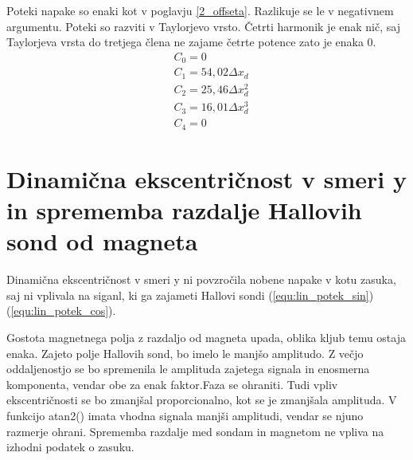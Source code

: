 Poteki napake so enaki kot v poglavju \ref{2_offseta}. Razlikuje se le v negativnem argumentu. Poteki so razviti v Taylorjevo vrsto. Četrti harmonik je enak nič, saj Taylorjeva vrsta do tretjega člena ne zajame četrte potence zato je enaka 0.
\begin{eqnarray}
&C_0 =0\\
&C_1 =54,02\Delta x_d\\     
&C_2 =25,46\Delta x_d^{2}\\             
&C_3 =16,01\Delta x_d^{3}\\         
&C_4 =0            
\end{eqnarray}
\section{Dinamična ekscentričnost v smeri y in sprememba razdalje Hallovih sond od magneta }
Dinamična ekscentričnost v smeri y ni povzročila nobene napake v kotu zasuka, saj ni vplivala na siganl, ki ga zajameti Hallovi sondi (\ref{equ:lin_potek_sin})(\ref{equ:lin_potek_cos}).

Gostota magnetnega polja z razdaljo od magneta upada, oblika kljub temu ostaja enaka. Zajeto polje Hallovih sond, bo imelo le manjšo amplitudo. Z večjo oddaljenostjo se bo spremenila le amplituda zajetega signala in enosmerna komponenta, vendar obe za enak faktor.Faza se ohraniti. Tudi vpliv ekscentričnosti se bo zmanjšal proporcionalno, kot se je zmanjšala amplituda. V funkcijo atan2() imata vhodna signala manjši amplitudi, vendar se njuno razmerje ohrani. Sprememba razdalje med sondam in magnetom ne vpliva na izhodni podatek o zasuku.